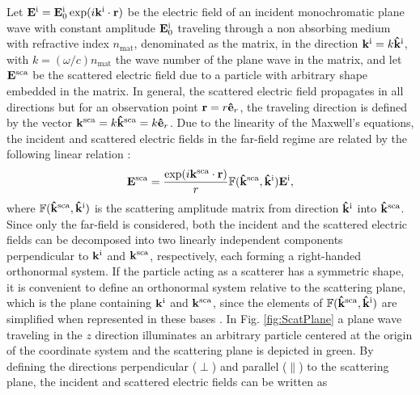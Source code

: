 
Let $\vb{E}^\text{i} = \vb{E}^\text{i}_0 \exp(i\vb{k}^\text{i}\cdot\vb{r})$ be the electric field of an incident monochromatic plane wave with constant amplitude $\vb{E}_0^\text{i}$  traveling through a non absorbing medium with refractive index $n_\text{mat}$, denominated as the matrix, in the direction $\vb{k}^\text{i} = k\vu{k}^\text{i}$, with $k = (\omega/c)n_\text{mat}$ the wave number of the plane wave in the matrix, and let $\vb{E}^\text{sca}$ be the scattered electric field due to a particle with arbitrary shape embedded in the matrix. In general, the scattered electric field propagates in all directions but for an observation point $\vb{r} = r\vu{e}_r$, the traveling direction is defined by the vector $\vb{k}^\text{sca} = k\vu{k}^\text{sca} = k\vu{e}_r$.  Due to the linearity of the Maxwell's equations,   the incident and scattered electric fields  in the far-field regime are related by the following linear relation \cite{tsang_scattering_2000}:
%
%
 \begin{equation}
	\vb{E}^\text{sca} =   \frac{\exp(i\vb{k}^\text{sca}\cdot\vb{r})}{r} \mathbb{F}(\vu{k}^\text{sca}, \vu{k}^\text{i}) \vb{E}^\text{i},
 \label{eq:ScatAmpMat}
 \end{equation}
%
where $\mathbb{F}(\vu{k}^\text{sca}, \vu{k}^\text{i})$ is the scattering  amplitude matrix from direction $\vu{k}^\text{i}$ into $\vu{k}^\text{sca}$. Since only the far-field is considered, both the incident and the scattered electric fields can be decomposed into two linearly independent components perpendicular to $\vb{k}^\text{i}$ and $\vb{k}^\text{sca}$, respectively, each forming a right-handed orthonormal system. If the particle acting as a scatterer has a symmetric shape, it is convenient to define an orthonormal system relative to the scattering plane, which is the plane containing $\vb{k}^\text{i}$ and $\vb{k}^\text{sca}$, since the elements of $\mathbb{F}(\vu{k}^\text{sca}, \vu{k}^\text{i})$ are simplified when represented in these bases \cite{tsang_scattering_2000}. In Fig. \ref{fig:ScatPlane} a plane wave traveling in the $z$ direction illuminates an arbitrary particle centered at the origin of the coordinate system and the scattering plane is depicted in green. By defining the directions perpendicular  ($\perp$) and parallel ($\parallel$) to the scattering plane,  the incident and scattered electric fields can be written as
